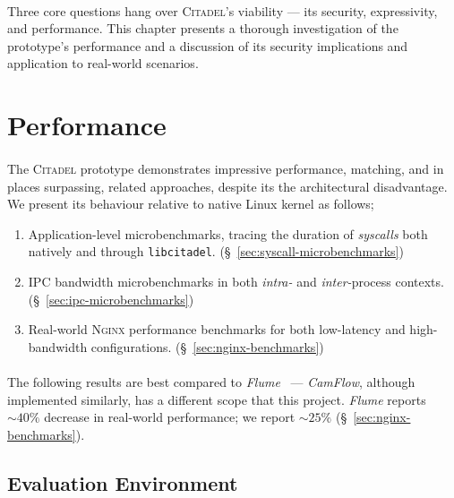 \paragraph{} Three core questions hang over \textsc{Citadel}'s viability --- its security, expressivity, and performance. This chapter presents a thorough investigation of the prototype's performance and a discussion of its security implications and application to real-world scenarios.

\section{Performance}
\label{sec:performance}

\paragraph{} The \textsc{Citadel} prototype demonstrates impressive performance, matching, and in places surpassing, related approaches, despite its the architectural disadvantage. We present its behaviour relative to native Linux kernel as follows;

\begin{enumerate}
    \item Application-level microbenchmarks, tracing the duration of \textit{syscalls} both natively and through \texttt{libcitadel}. (§~\ref{sec:syscall-microbenchmarks})
    \item IPC bandwidth microbenchmarks in both \textit{intra-} and \textit{inter-}process contexts. (§~\ref{sec:ipc-microbenchmarks})
    \item Real-world \textsc{Nginx} performance benchmarks for both low-latency and high-bandwidth configurations. (§~\ref{sec:nginx-benchmarks})
\end{enumerate}

\paragraph{} The following results are best compared to \textit{Flume}~\cite{flume} --- \textit{CamFlow}, although implemented similarly, has a different scope that this project. \textit{Flume} reports $\sim 40\%$ decrease in real-world performance; we report $\sim 25\%$ (§~\ref{sec:nginx-benchmarks}).

\subsection{Evaluation Environment}

